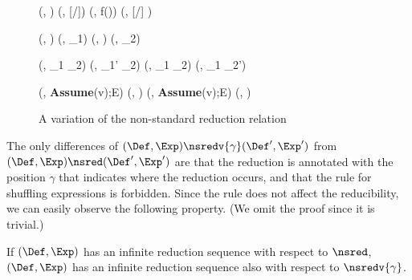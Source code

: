\begin{figure}[tbp]

          {(\Def,  )  \nsredv{\epsilon} (\Def, [/]\Exp)}
\vspace*{1ex}
{(\Def, f()) \nsredv{\epsilon} (\Def, [/] \Exp)}

\vspace*{1ex}
 {(\Def, )  \nsredv{\epsilon} (\Def, \Exp_1)}
\vspace*{1ex}
 {(\Def, )  \nsredv{\epsilon} (\Def, \Exp_2)}
\vspace*{1ex}

 {(\Def, \Exp_1 \nondet \Exp_2) \nsredv{1\cdot \gamma} (\Def, \Exp_1' \nondet \Exp_2)}
\vspace*{1ex}
 {(\Def, \Exp_1 \nondet \Exp_2) \nsredv{2\cdot \gamma} (\Def, \Exp_1 \nondet \Exp_2')}

\vspace*{1ex}
  {(\Def, \textbf{Assume}(v);E) \nsredv{\epsilon} (\Def, \Exp)}
\vspace*{1ex}
  {(\Def, \textbf{Assume}(v);E) \nsredv{\epsilon} (\Def, \skipexp)}

\caption{A variation of the non-standard reduction relation}
\label{fig:nsredv}
\end{figure}

The only differences of
\((\Def,\Exp) \nsredv{\gamma} (\Def',\Exp')\) from
\((\Def,\Exp) \nsred (\Def',\Exp')\) are that
the reduction is annotated with the position \(\gamma\) that indicates where the reduction occurs,
and that the rule  for shuffling expressions is forbidden.
Since the rule  does not affect the reducibility, we can easily
observe the following property. (We omit the proof since it is trivial.)
\begin{lemma}
  \label{lem:nsred-vs-nsredv}
  If \((\Def,\Exp)\) has an infinite reduction sequence with respect to \(\nsred\),
  \((\Def,\Exp)\) has an infinite reduction sequence also with respect to \(\nsredv{\gamma}\).
\end{lemma}

